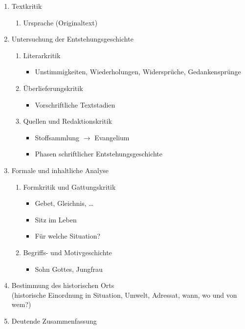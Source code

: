 \documentclass[11pt, paper=a4, twocolumn]{scrartcl}
\begin{document}
	\begin{enumerate}
		\item Textkritik
			\begin{enumerate}
				\item Ursprache (Originaltext)
			\end{enumerate}
		\item Untersuchung der Entstehungsgeschichte
			\begin{enumerate}
				\item Literarkritik
					\begin{itemize}
						\item Unstimmigkeiten, Wiederholungen, Widersprüche, Gedankensprünge
					\end{itemize}
				\item Überlieferungskritik
					\begin{itemize}
						\item Vorschriftliche Textstadien
					\end{itemize}
				\item Quellen und Redaktionskritik
					\begin{itemize}
						\item Stoffsammlung $\rightarrow$ Evangelium
						\item Phasen schriftlicher Entstehungsgeschichte
					\end{itemize}
			\end{enumerate}
		\item Formale und inhaltliche Analyse
			\begin{enumerate}
				\item Formkritik und Gattungskritik
					\begin{itemize}
						\item Gebet, Gleichnis, \dots
						\item Sitz im Leben
						\item Für welche Situation?
					\end{itemize}
				\item Begriffs- und Motivgeschichte
					\begin{itemize}
						\item \glqq{}Sohn Gottes\grqq{}, \glqq{}Jungfrau\grqq{}
					\end{itemize}
			\end{enumerate}
		\item Bestimmung des historischen Orts\\
		(historische Einordnung in Situation, Umwelt, Adressat, wann, wo und von wem?)
		\item Deutende Zusammenfassung
	\end{enumerate}
\end{document}
